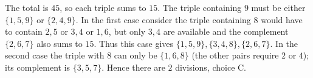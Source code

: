 The total is $45$, so each triple sums to $15$. The triple containing $9$ must be either $\{1,5,9\}$ or $\{2,4,9\}$. In the first case consider the triple containing $8$ would have to contain $2,5$ or $3,4$ or $1,6$, but only $3,4$ are available and the complement $\{2,6,7\}$ also sums to $15$. Thus this case gives $\{1,5,9\},\{3,4,8\},\{2,6,7\}$. In the second case the triple with $8$ can only be $\{1,6,8\}$ (the other pairs require $2$ or $4$); its complement is $\{3,5,7\}$. Hence there are $\boxed 2$ divisions, choice C.
